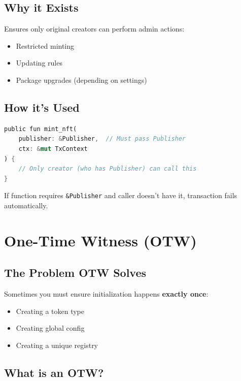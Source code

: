 \documentclass[11pt]{article}
\begin{document}
\subsection{Why it Exists}

Ensures only original creators can perform admin actions:
\begin{itemize}
  \item Restricted minting
  \item Updating rules
  \item Package upgrades (depending on settings)
\end{itemize}

\subsection{How it's Used}

\begin{lstlisting}[language=Rust]
public fun mint_nft(
    publisher: &Publisher,  // Must pass Publisher
    ctx: &mut TxContext
) {
    // Only creator (who has Publisher) can call this
}
\end{lstlisting}

\begin{noteBox}
If function requires \texttt{\&Publisher} and caller doesn't have it, transaction fails automatically.
\end{noteBox}

\section{One-Time Witness (OTW)}

\subsection{The Problem OTW Solves}

Sometimes you must ensure initialization happens \textbf{exactly once}:
\begin{itemize}
  \item Creating a token type
  \item Creating global config
  \item Creating a unique registry
\end{itemize}

\subsection{What is an OTW?}
\end{document}

